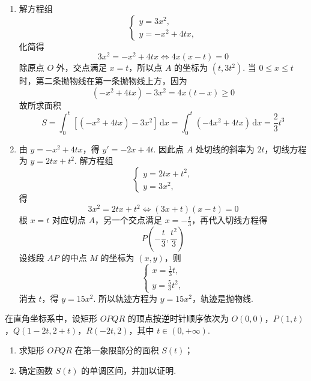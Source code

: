 \documentclass[UTF8,a4paper,oneside,11pt]{ctexbook}
\begin{document}
\begin{solution}
\begin{enumerate}
\item 解方程组
\[
\begin{cases}
y=3x^2,\\
y=-x^2+4tx,
\end{cases}
\]
化简得
\[
3x^2=-x^2+4tx
\Longleftrightarrow 4x(x-t)=0
\]
除原点 \(O\) 外，交点满足 \(x=t\)，所以点 \(A\) 的坐标为 \((t,3t^2)\).
当 \(0\leqslant x\leqslant t\) 时，第二条抛物线在第一条抛物线上方，因为
\[
(-x^2+4tx)-3x^2=4x(t-x)\geqslant 0
\]
故所求面积
\[
S = \int_0^t \left[(-x^2 + 4tx) - 3x^2\right] \,\mathrm{d}x
= \int_0^t (-4x^2 + 4tx) \,\mathrm{d}x
= \frac{2}{3}t^3
\]

\item 由 \(y = -x^2 + 4tx\)，得 \(y' = -2x + 4t\).
因此点 \(A\) 处切线的斜率为 \(2t\)，切线方程为 \(y = 2tx + t^2\).
解方程组
\[
\begin{cases}
y=2tx+t^2,\\
y=3x^2,
\end{cases}
\]
得
\[
3x^2=2tx+t^2
\Longleftrightarrow (3x+t)(x-t)=0
\]
根 \(x=t\) 对应切点 \(A\)，另一个交点满足 \(x=-\frac{t}{3}\)，再代入切线方程得
\[
P\left(-\frac{t}{3},\frac{t^2}{3}\right)
\]
设线段 \(AP\) 的中点 \(M\) 的坐标为 \((x,y)\)，则
\[
\begin{cases}
x=\frac{1}{3}t,\\
y=\frac{5}{3}t^2,
\end{cases}
\]
消去 \(t\)，得 \(y = 15x^2\).
所以轨迹方程为 \(y = 15x^2\)，轨迹是抛物线.
\end{enumerate}
\end{solution}

\begin{problem}
在直角坐标系中，设矩形 \(OPQR\) 的顶点按逆时针顺序依次为 \(O(0,0)\)，\(P(1,t)\)，\(Q(1 - 2t, 2 + t)\)，\(R(-2t,2)\)，其中 \(t \in (0,+\infty)\).

\begin{enumerate}
\item 求矩形 \(OPQR\) 在第一象限部分的面积 \(S(t)\)；
\item 确定函数 \(S(t)\) 的单调区间，并加以证明.
\end{enumerate}
\end{problem}
\end{document}
